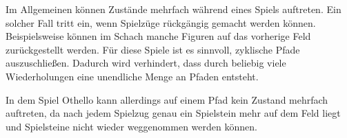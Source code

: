 Im Allgemeinen können Zustände mehrfach während eines Spiels auftreten. Ein solcher Fall tritt ein, wenn Spielzüge
rückgängig gemacht werden können. Beispielsweise können im Schach manche Figuren auf das vorherige Feld zurückgestellt
werden. Für diese Spiele ist es sinnvoll, zyklische Pfade auszuschließen. Dadurch wird verhindert, dass durch beliebig
viele Wiederholungen eine unendliche Menge an Pfaden entsteht.
\cite[S.~75]{ai2010russel}

In dem Spiel Othello kann allerdings auf einem Pfad kein Zustand mehrfach auftreten, da nach jedem Spielzug genau ein
Spielstein mehr auf dem Feld liegt und Spielsteine nicht wieder weggenommen werden können.
